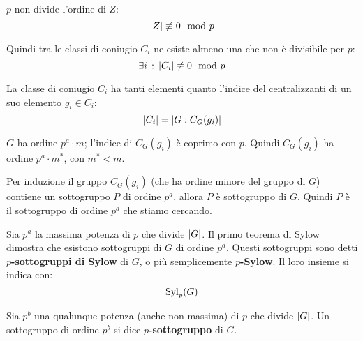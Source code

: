 \begin{dimostrazione}
    $p$ non divide l'ordine di $Z$:
    \begin{equation*}
        \lvert Z \rvert \not\equiv 0 \mod p
    \end{equation*}

    Quindi tra le classi di coniugio $C_i$ ne esiste almeno una che non è divisibile per $p$:
    \begin{equation*}
        \exists i \,:\, \lvert C_i \rvert \not\equiv 0 \mod p
    \end{equation*}

    La classe di coniugio $C_i$ ha tanti elementi quanto l'indice del centralizzanti di un suo elemento $g_i \in C_i$:
    \begin{equation*}
        \lvert C_i \rvert = \lvert G:C_G(g_i) \rvert
    \end{equation*}

    $G$ ha ordine $p^a \cdot m$; l'indice di $C_G(g_i)$ è coprimo con $p$. Quindi $C_G(g_i)$ ha ordine $p^a \cdot m^*$,
    con $m^* < m$.

    Per induzione il gruppo $C_G(g_i)$ (che ha ordine minore del gruppo di $G$) contiene un sottogruppo $P$ di ordine
    $p^a$, allora $P$ è sottogruppo di $G$.
    Quindi $P$ è il sottogruppo di ordine $p^a$ che stiamo cercando.
\end{dimostrazione}

Sia $p^a$ la massima potenza di $p$ che divide $\lvert G \rvert$.
Il primo teorema di Sylow dimostra che esistono sottogruppi di $G$ di ordine $p^a$.
Questi sottogruppi sono detti \textbf{$p$-sottogruppi di Sylow} di $G$, o più semplicemente \textbf{$p$-Sylow}.
Il loro insieme si indica con:
\begin{equation*}
    \operatorname{Syl}_p(G)
\end{equation*}

Sia $p^b$ una qualunque potenza (anche non massima) di $p$ che divide $\lvert G \rvert$.
Un sottogruppo di ordine $p^b$ si dice \textbf{$p$-sottogruppo} di $G$.

